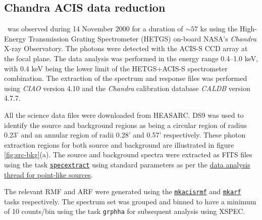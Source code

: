     
    \subsection{Chandra ACIS data reduction}
    	\source\ was observed during 14 November 2000 for a duration of $\sim 57$ ks using the High-Energy Transmission Grating Spectrometer (HETGS) on-board NASA's \textit{Chandra} X-ray Observatory. %
    	The photons were detected with the ACIS-S CCD array at the focal plane. The data analysis was performed in the energy range 0.4--1.0 keV, with 0.4 keV being the lower limit of the HETGS+ACIS-S spectrometer combination. The extraction of the spectrum and response files was performed using \textit{CIAO} version 4.10 and the \textit{Chandra} calibration database \textit{CALDB} version 4.7.7.
    	
    	All the science data files were downloaded from HEASARC. DS9 was used to identify the source and background regions as being a circular region of radius 0.23' and an annular region of radii 0.28' and 0.57' respectively. These photon extraction regions for both source and background are illustrated in figure \ref{fig:src-bkg}(a). The source and background spectra were extracted as FITS files using the task %
    	\href{https://cxc.cfa.harvard.edu/ciao/ahelp/specextract.html}{\texttt{specextract}} using standard parameters as per the %
    	\href{https://cxc.cfa.harvard.edu/ciao/threads/pointlike/}{data analysis thread for point-like sources}. %
    	
    	The relevant RMF and ARF were generated using the %
    	\href{https://cxc.cfa.harvard.edu/ciao/ahelp/mkacisrmf.html}{\texttt{mkacisrmf}} and %
    	\href{https://cxc.cfa.harvard.edu/ciao/ahelp/mkarf.html}{\texttt{mkarf}} tasks respectively. The spectrum set was grouped and binned to have a minimum of 10 counts/bin using the task \texttt{grphha} for subsequent analysis using XSPEC.
    	
